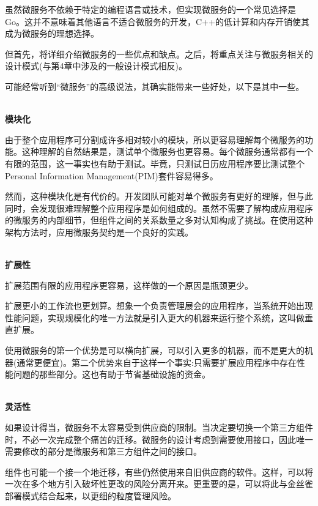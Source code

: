

虽然微服务不依赖于特定的编程语言或技术，但实现微服务的一个常见选择是Go。这并不意味着其他语言不适合微服务的开发，C++的低计算和内存开销使其成为微服务的理想选择。 

但首先，将详细介绍微服务的一些优点和缺点。之后，将重点关注与微服务相关的设计模式(与第4章中涉及的一般设计模式相反)。


可能经常听到“微服务”的高级说法，其确实能带来一些好处，以下是其中一些。

\hspace*{\fill} \\ %
\noindent
\textbf{模块化}

由于整个应用程序可分割成许多相对较小的模块，所以更容易理解每个微服务的功能。这种理解的自然结果是，测试单个微服务也更容易。每个微服务通常都有一个有限的范围，这一事实也有助于测试。毕竟，只测试日历应用程序要比测试整个Personal Information Management(PIM)套件容易得多。

然而，这种模块化是有代价的。开发团队可能对单个微服务有更好的理解，但与此同时，会发现很难理解整个应用程序是如何组成的。虽然不需要了解构成应用程序的微服务的内部细节，但组件之间的关系数量之多对认知构成了挑战。在使用这种架构方法时，应用微服务契约是一个良好的实践。

\hspace*{\fill} \\ %
\noindent
\textbf{扩展性}

扩展范围有限的应用程序更容易，这样做的一个原因是瓶颈更少。

扩展更小的工作流也更划算。想象一个负责管理展会的应用程序，当系统开始出现性能问题，实现规模化的唯一方法就是引入更大的机器来运行整个系统，这叫做垂直扩展。

使用微服务的第一个优势是可以横向扩展，可以引入更多的机器，而不是更大的机器(通常更便宜)。第二个优势来自于这样一个事实:只需要扩展应用程序中存在性能问题的那些部分。这也有助于节省基础设施的资金。

\hspace*{\fill} \\ %
\noindent
\textbf{灵活性}

如果设计得当，微服务不太容易受到供应商的限制。当决定要切换一个第三方组件时，不必一次完成整个痛苦的迁移。微服务的设计考虑到需要使用接口，因此唯一需要修改的部分是微服务和第三方组件之间的接口。

组件也可能一个接一个地迁移，有些仍然使用来自旧供应商的软件。这样，可以将一次在多个地方引入破坏性更改的风险分离开来。更重要的是，可以将此与金丝雀部署模式结合起来，以更细的粒度管理风险。

